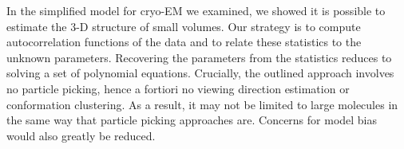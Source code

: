 \documentclass[english,11pt]{article}
\newcommand{\1}{\mathbf{1}}
\numberwithin{equation}{section}
\theoremstyle{plain}
\theoremstyle{definition}
\theoremstyle{remark}
\theoremstyle{plain}
\theoremstyle{remark}
\theoremstyle{plain}
\theoremstyle{plain}
\begin{document}


%

In the simplified model for cryo-EM we examined, we showed it is possible to estimate the 3-D structure of small volumes. 
Our strategy is to compute autocorrelation functions of the data and to relate these statistics to the unknown parameters. Recovering the parameters from the statistics reduces to solving a set of polynomial equations.
Crucially, the outlined approach involves no particle picking, hence a fortiori no viewing direction estimation or conformation clustering. As a result, it may not be limited to large molecules in the same way that particle picking approaches are. Concerns for model bias would also greatly be reduced.


\end{document}
